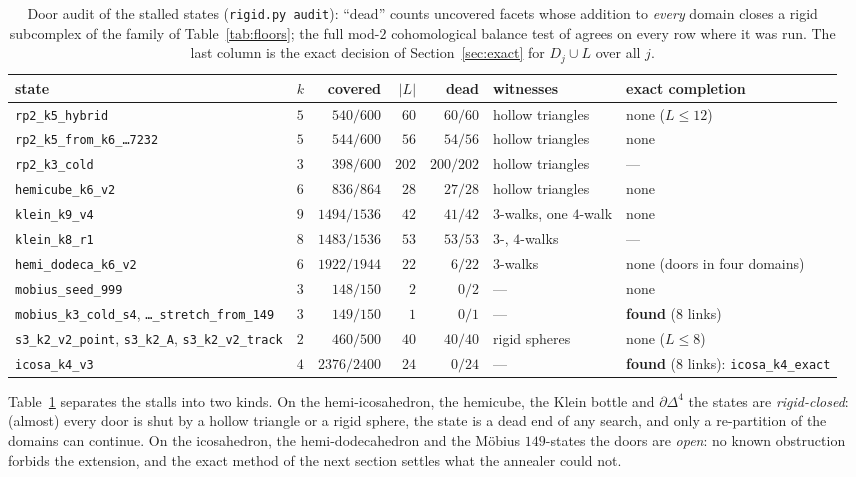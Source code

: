 \documentclass[12pt]{article}
\begin{document}
\begin{table}[H]
\centering\footnotesize
\setlength{\tabcolsep}{3.5pt}
\begin{tabular}{@{}>{\raggedright\arraybackslash}p{4.3cm}crrr>{\raggedright\arraybackslash}p{2.2cm}>{\raggedright\arraybackslash}p{2.9cm}@{}}
\toprule
state & $k$ & covered & $|L|$ & dead & witnesses & exact completion \\
\midrule
\texttt{rp2\_k5\_hybrid} & $5$ & $540/600$ & $60$ & $60/60$ & hollow triangles & none ($L\le12$)\\
\texttt{rp2\_k5\_from\_k6\_\dots7232} & $5$ & $544/600$ & $56$ & $54/56$ & hollow triangles & none\\
\texttt{rp2\_k3\_cold} & $3$ & $398/600$ & $202$ & $200/202$ & hollow triangles & ---\\
\texttt{hemicube\_k6\_v2} & $6$ & $836/864$ & $28$ & $27/28$ & hollow triangles & none\\
\texttt{klein\_k9\_v4} & $9$ & $1494/1536$ & $42$ & $41/42$ & $3$-walks, one $4$-walk & none\\
\texttt{klein\_k8\_r1} & $8$ & $1483/1536$ & $53$ & $53/53$ & $3$-, $4$-walks & ---\\
\texttt{hemi\_dodeca\_k6\_v2} & $6$ & $1922/1944$ & $22$ & $6/22$ & $3$-walks & none (doors in four domains)\\
\texttt{mobius\_seed\_999} & $3$ & $148/150$ & $2$ & $0/2$ & --- & none\\
\texttt{mobius\_k3\_cold\_s4}, \texttt{\dots\_stretch\_from\_149} & $3$ & $149/150$ & $1$ & $0/1$ & --- & \textbf{found} ($8$ links)\\
\texttt{s3\_k2\_v2\_point}, \texttt{s3\_k2\_A}, \texttt{s3\_k2\_v2\_track} & $2$ & $460/500$ & $40$ & $40/40$ & rigid spheres & none ($L\le8$)\\
\texttt{icosa\_k4\_v3} & $4$ & $2376/2400$ & $24$ & $0/24$ & --- & \textbf{found} ($8$ links): \texttt{icosa\_k4\_exact}\\
\bottomrule
\end{tabular}
\caption{Door audit of the stalled states (\texttt{rigid.py audit}):
``dead'' counts uncovered facets whose addition to \emph{every} domain
closes a rigid subcomplex of the family of Table~\ref{tab:floors}; the full
mod-$2$ cohomological balance test of \cite{PM26b} agrees on every row where
it was run.  The last column is the exact decision of
Section~\ref{sec:exact} for $D_j\cup L$ over all $j$.}
\label{tab:audit}
\end{table}

Table~\ref{tab:audit} separates the stalls into two kinds.  On the
hemi-icosahedron, the hemicube, the Klein bottle and $\partial\Delta^4$ the
states are \emph{rigid-closed}: (almost) every door is shut by a hollow
triangle or a rigid sphere, the state is a dead end of any search, and only
a re-partition of the domains can continue.  On the icosahedron, the
hemi-dodecahedron and the M\"obius $149$-states the doors are \emph{open}:
no known obstruction forbids the extension, and the exact method of the next
section settles what the annealer could not.
\end{document}
